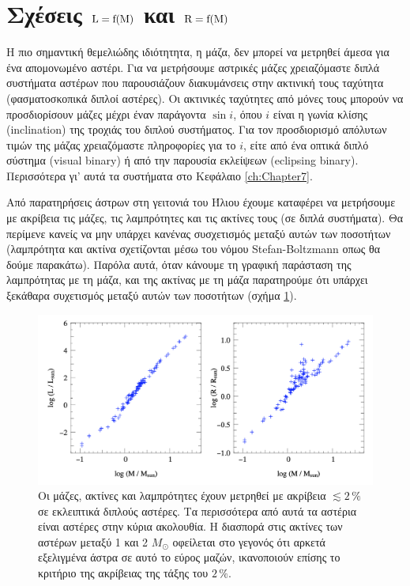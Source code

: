 \section{Σχέσεις $\rm L = f(M)$ και $\rm R = f(M)$}
Η πιο σημαντική θεμελιώδης ιδιότητητα, η μάζα, δεν μπορεί να μετρηθεί άμεσα για ένα απομονωμένο αστέρι. Για να μετρήσουμε αστρικές μάζες χρειαζόμαστε διπλά συστήματα αστέρων που παρουσιάζουν διακυμάνσεις στην ακτινική τους ταχύτητα (φασματοσκοπικά διπλοί αστέρες). Οι ακτινικές ταχύτητες από μόνες τους μπορούν να προσδιορίσουν μάζες μέχρι έναν παράγοντα $\sin i$, όπου $i$ είναι η γωνία κλίσης (inclination) της τροχιάς του διπλού συστήματος. Για τον προσδιορισμό απόλυτων τιμών της μάζας χρειαζόμαστε πληροφορίες για το $i$, είτε από ένα οπτικά διπλό σύστημα (visual binary) ή από την παρουσία εκλείψεων (eclipsing binary). Περισσότερα γι' αυτά τα συστήματα στο Κεφάλαιο  \ref{ch:Chapter7}. 

Από παρατηρήσεις άστρων στη γειτονιά του Ήλιου έχουμε καταφέρει να μετρήσουμε με ακρίβεια τις μάζες, τις λαμπρότητες και τις ακτίνες τους (σε διπλά συστήματα). Θα περίμενε κανείς να μην υπάρχει κανένας συσχετισμός μεταξύ αυτών των ποσοτήτων (λαμπρότητα και ακτίνα σχετίζονται μέσω του νόμου Stefan-Boltzmann οπως θα δούμε παρακάτω). Παρόλα αυτά, όταν κάνουμε τη γραφική παράσταση της λαμπρότητας με τη μάζα, και της ακτίνας με τη μάζα παρατηρούμε ότι υπάρχει ξεκάθαρα συχετισμός μεταξύ αυτών των ποσοτήτων (σχήμα \ref{fig:luminosity_mass_relation}).

\begin{figure}[h]
    \centering
    \includegraphics[width=\linewidth]{Figures/luminosity_mass_relation.png}
    \caption{Οι μάζες, ακτίνες και λαμπρότητες έχουν μετρηθεί με ακρίβεια $\lesssim 2 \,\%$ σε εκλειπτικά διπλούς αστέρες. Τα περισσότερα από αυτά τα αστέρια είναι αστέρες στην κύρια ακολουθία. Η διασπορά στις ακτίνες των αστέρων μεταξύ 1 και 2 $M_{\odot}$ οφείλεται στο γεγονός ότι αρκετά εξελιγμένα άστρα σε αυτό το εύρος μαζών, ικανοποιούν επίσης το κριτήριο της ακρίβειας της τάξης του $2 \,\%$.}
    \label{fig:luminosity_mass_relation}
\end{figure}

